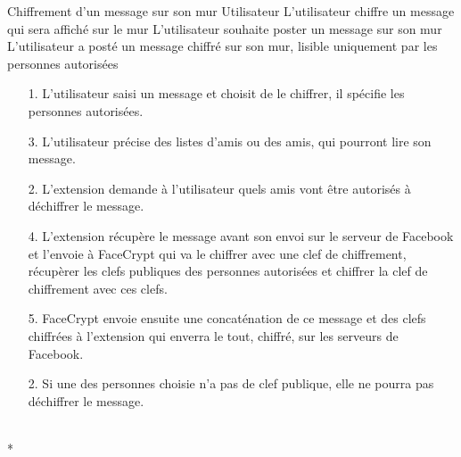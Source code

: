 \documentclass[a4paper,11pt,french]{article}
\begin{document}
\fiche
	{Chiffrement d'un message sur son mur}
	{Utilisateur}
	{L'utilisateur chiffre un message qui sera affiché sur le mur}
	{}
	{L'utilisateur souhaite poster un message sur son mur}
	{L'utilisateur a posté un message chiffré sur son mur, lisible uniquement par les personnes autorisées}
	{\begin{itemize}
	    \item[]
	  \item[1.] L'utilisateur saisi un message et choisit de le chiffrer,
          il spécifie les personnes autorisées.
      \item[3.] L'utilisateur précise des listes d'amis ou des amis, 
          qui pourront lire son message.
	\end{itemize}
	}
	{\begin{itemize}
        \item[]
        \item[2.] L'extension demande à l'utilisateur quels amis vont être
            autorisés à déchiffrer le message.
		\item[4.] L'extension récupère le message avant son envoi sur le serveur 
            de Facebook et l'envoie à FaceCrypt qui va le chiffrer avec une clef 
        de chiffrement, récupèrer les clefs publiques des personnes autorisées 
        et chiffrer la clef de chiffrement avec ces clefs.
		\item[5.] FaceCrypt envoie ensuite une concaténation de 
        ce message et des clefs chiffrées à l'extension qui enverra le tout,
        chiffré, sur les serveurs de Facebook.
	\end{itemize}
    }
	{}
\flots
    {}
    {\begin{itemize}
    \item[]
    \item[2.] Si une des personnes choisie n'a pas de clef publique,
        elle ne pourra pas déchiffrer le message.
    \end{itemize}
    }
    {}
\\*
\end{document}
